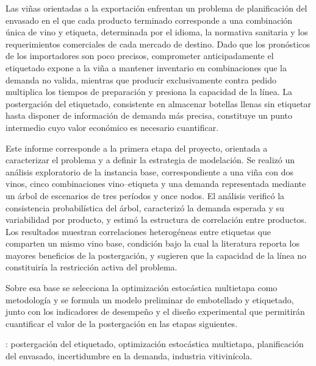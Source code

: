 Las viñas orientadas a la exportación enfrentan un problema de planificación del envasado en el que cada producto terminado corresponde a una combinación única de vino y etiqueta, determinada por el idioma, la normativa sanitaria y los requerimientos comerciales de cada mercado de destino. Dado que los pronósticos de los importadores son poco precisos, comprometer anticipadamente el etiquetado expone a la viña a mantener inventario en combinaciones que la demanda no valida, mientras que producir exclusivamente contra pedido multiplica los tiempos de preparación y presiona la capacidad de la línea. La postergación del etiquetado, consistente en almacenar botellas llenas sin etiquetar hasta disponer de información de demanda más precisa, constituye un punto intermedio cuyo valor económico es necesario cuantificar.

Este informe corresponde a la primera etapa del proyecto, orientada a caracterizar el problema y a definir la estrategia de modelación. Se realizó un análisis exploratorio de la instancia base, correspondiente a una viña con dos vinos, cinco combinaciones vino--etiqueta y una demanda representada mediante un árbol de escenarios de tres períodos y once nodos. El análisis verificó la consistencia probabilística del árbol, caracterizó la demanda esperada y su variabilidad por producto, y estimó la estructura de correlación entre productos. Los resultados muestran correlaciones heterogéneas entre etiquetas que comparten un mismo vino base, condición bajo la cual la literatura reporta los mayores beneficios de la postergación, y sugieren que la capacidad de la línea no constituiría la restricción activa del problema.

Sobre esa base se selecciona la optimización estocástica multietapa como metodología y se formula un modelo preliminar de embotellado y etiquetado, junto con los indicadores de desempeño y el diseño experimental que permitirán cuantificar el valor de la postergación en las etapas siguientes.

\vfill
{}: postergación del etiquetado, optimización estocástica multietapa, planificación del envasado, incertidumbre en la demanda, industria vitivinícola.